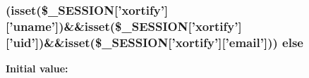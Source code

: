 \hypertarget{projecthoneypot_8org_2post_8loader_8php_a99f38b0c8c178a9286d03586510aa646}{
\subsubsection[{else}]{ (isset(\$\-\_\-\-S\-E\-S\-S\-I\-O\-N\mbox{[}'xortify'\mbox{]}\mbox{[}'uname'\mbox{]})\&\&isset(\$\-\_\-\-S\-E\-S\-S\-I\-O\-N\mbox{[}'xortify'\mbox{]}\mbox{[}'uid'\mbox{]})\&\&isset(\$\-\_\-\-S\-E\-S\-S\-I\-O\-N\mbox{[}'xortify'\mbox{]}\mbox{[}'email'\mbox{]})) else}}\label{projecthoneypot_8org_2post_8loader_8php_a99f38b0c8c178a9286d03586510aa646}
{\bfseries Initial value\-:}
